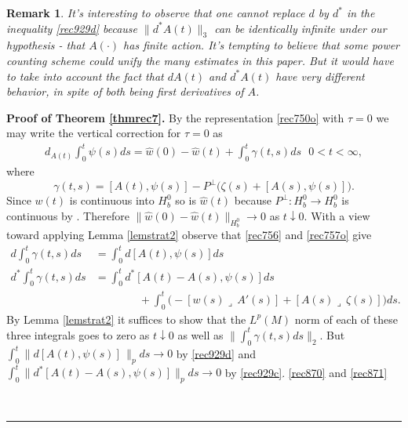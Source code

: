 \documentclass[12pt]{article}
\newtheorem{remark}[theorem]{Remark}
\newenvironment{proof}[1][Proof]{\textbf{#1.} }{\ \rule{0.5em}{0.5em}}
\def \({\Big(}
\def \){\Big)}
\def \beq{\begin{equation}}
\def \eeq{\end{equation}}
\def \eref{\eqref}
\def \lrc{\lrcorner\,}
\numberwithin{equation}{section}
\begin{document}
\begin{remark}{\rm
 
         It's interesting to observe that     one cannot replace $d$ by $d^*$ in the
          inequality  \eref{rec929d} because $\|d^*A(t)\|_3$ can be identically infinite under
  our hypothesis - that $A(\cdot)$ has finite action. It's tempting to believe that some power counting scheme
  could unify the many estimates in this paper. But it would have to take into 
  account the fact that $dA(t)$ and $d^* A(t)$
  have very different behavior, in spite of both being first derivatives of $A$.
 }
 \end{remark}      



\bigskip
\noindent
     \begin{proof}[Proof of Theorem \ref{thmrec7}] 
 By the representation \eref{rec750o} 
with $\tau =0$ we may write
the vertical correction for $\tau =0$ as
\begin{align} 
d_{A(t)} \int_0^t \psi(s) ds =  \hat w(0) - \hat w(t)    
  +\int_0^t \gamma(t,s) ds     \ \ \   0< t <\infty,           \label{rec750o0}   
  \end{align}
  where
    \beq
  \gamma(t,s) = [A(t), \psi(s)] - P^\perp\(\zeta(s) + [A(s), \psi(s)]\) . \label{rec750o1}
  \eeq      
 Since $w(t)$ is continuous into $H_b^0$ so is  
     $\hat w(t)$ because $P^\perp:H_b^0 \rightarrow H_b^0$ is continuous by   \cite[Lemma 6.10]{G70}.
     Therefore $\|\hat w(0) - \hat w(t)\|_{H_b^0} \rightarrow 0$ as $t \downarrow 0$.
With a view toward applying Lemma \ref{lemstrat2} observe that \eref{rec756} and \eref{rec757o} give
\begin{align}
d\int_0^t \gamma(t,s) ds &= \int_0^t d[A(t), \psi(s) ] ds                             \label{rec752a}\\
d^*\int_0^t \gamma(t,s) ds&=  \int_0^t d^*[A(t)-A(s), \psi(s) ] ds              \label{rec752b}\\
 & \qquad\qquad + \int_0^t \( -[w(s) \lrc A'(s)] + [A(s) \lrc \zeta(s)] \) ds.     \label{rec752c}
\end{align}
By Lemma  \ref{lemstrat2} it suffices to show that the $L^p(M)$ norm of each of these three integrals 
goes to zero as $t\downarrow 0$ as well as  $\|\int_0^t \gamma(t,s) ds\|_2$.
           But  \linebreak 
    $\int_0^t \| d[A(t), \psi(s)]\, \|_p ds \rightarrow 0$ by  \eref{rec929d} and
$ \int_0^t \| d^*[A(t) -A(s), \psi(s)] \|_p ds \rightarrow 0$ by \eref{rec929c}. \eref{rec870} and \eref{rec871}

\end{proof}
\end{document}

